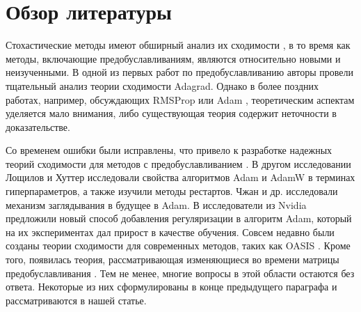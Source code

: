 \section{Обзор литературы}

Стохастические методы имеют обширный анализ их сходимости \citep{schneider2007stochastic, heyman2004stochastic, spall1998implementation}, в то время как методы, включающие предобуславливаниям, являются относительно новыми и неизученными. В одной из первых работ по предобуславливанию \citep{duchi2011adaptive} авторы провели тщательный анализ теории сходимости Adagrad.
Однако в более поздних работах, например, обсуждающих RMSProp \citep{rmsprop} или Adam \citep{kingma2014adam}, теоретическим аспектам уделяется мало внимания, либо существующая теория содержит неточности в доказательстве.

Со временем ошибки были исправлены, что привело к разработке надежных теорий сходимости для методов с предобуславливанием \citep{reddi2019convergence, defossez2020simple}.
В другом исследовании Лощилов и Хуттер \citep{loshchilov2017decoupled} исследовали свойства алгоритмов Adam и AdamW в терминах гиперпараметров, а также изучили методы рестартов. Чжан и др.\citep{zhang2019lookahead} исследовали механизм заглядывания в будущее в Adam. В \citep{ginsburg2020stochastic} исследователи из Nvidia предложили новый способ добавления регуляризации в алгоритм Adam, который на их экспериментах дал прирост в качестве обучения.
Совсем недавно были созданы теории сходимости для современных методов, таких как OASIS \citep{goldberg2011oasis, sadiev2022stochastic}.
Кроме того, появилась теория, рассматривающая изменяющиеся во времени матрицы предобуславливания \citep{beznosikov2022scaled}.
Тем не менее, многие вопросы в этой области остаются без ответа.
Некоторые из них сформулированы в конце предыдущего параграфа и рассматриваются в нашей статье.

